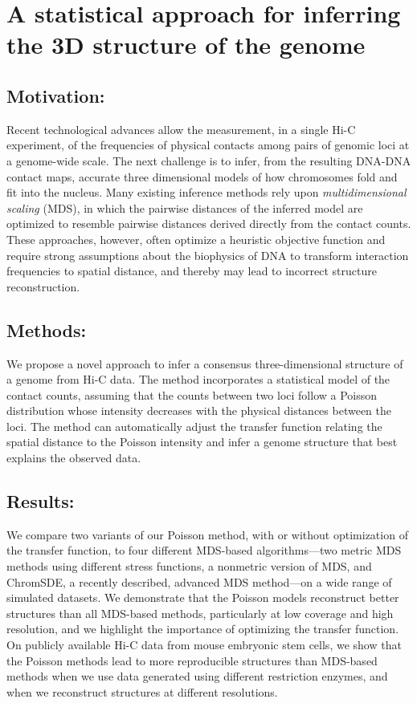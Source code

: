 


\chapter{A statistical approach for inferring the 3D structure of the genome} %
\graphicspath{{2_chapter/figures/}}


\section{Motivation:} Recent technological advances allow the
measurement, in a single Hi-C experiment, of the frequencies of
physical contacts among pairs of genomic loci at a genome-wide
scale. The next challenge is to infer, from the resulting DNA-DNA
contact maps, accurate three dimensional models of how chromosomes
fold and fit into the nucleus. Many existing
inference methods rely upon {\em multidimensional scaling} (MDS), in
which the pairwise distances of the inferred model are optimized to
resemble pairwise distances derived directly from the contact
counts. These approaches, however, often optimize a heuristic objective
function and require strong assumptions about the biophysics of
DNA to transform interaction frequencies to spatial distance, and thereby
may lead to incorrect structure reconstruction.

\section{Methods:}
We propose a novel approach to infer a consensus three-dimensional
structure of a genome from Hi-C data. The method incorporates a
statistical model of the contact counts, assuming that the counts
between two loci follow a Poisson distribution whose intensity decreases
with the physical distances between the loci. The method can automatically
adjust the transfer function relating the spatial distance to the Poisson
intensity and infer a genome structure that best explains the observed data.

\section{Results:}
We compare two variants of our Poisson method, with or without
optimization of the transfer function, to four different MDS-based
algorithms---two metric MDS methods using different stress functions,
a nonmetric version of MDS, and ChromSDE, a recently described, advanced
MDS method---on a wide range of simulated datasets. We demonstrate that the
Poisson models reconstruct better structures than all MDS-based methods,
particularly at low coverage and high resolution, and we highlight the
importance of optimizing the transfer function. On publicly available Hi-C data
from mouse embryonic stem cells, we show that the Poisson methods lead to more
reproducible structures than MDS-based methods when we use data generated using
different restriction enzymes, and when we reconstruct structures at different
resolutions.
